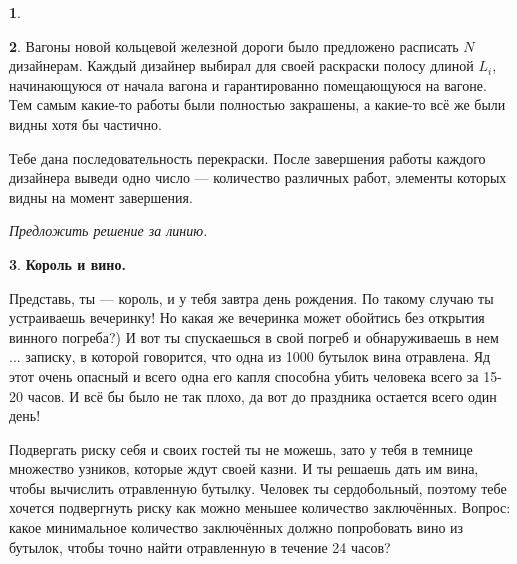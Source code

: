 \documentclass[14pt, a4paper]{extarticle}
\theoremstyle{definition}
\newtheorem{problem}{}
\theoremstyle{definition}
\theoremstyle{remark}
\numberwithin{equation}{section}
\begin{document}
\begin{problem}
\begin{figure}[H]
    \end{figure}
\end{problem}

\begin{problem}
    Вагоны новой кольцевой железной дороги было предложено расписать 
    $N$ дизайнерам. Каждый дизайнер выбирал для своей раскраски полосу 
    длиной $L_i$, начинающуюся от начала вагона и гарантированно 
    помещающуюся на вагоне. Тем самым какие-то работы были полностью 
    закрашены, а какие-то всё же были видны хотя бы частично.

    Тебе дана последовательность перекраски. После завершения работы 
    каждого дизайнера выведи одно число — количество различных работ, 
    элементы которых видны на момент завершения.

    \textit{Предложить решение за линию.}
\end{problem}

\begin{problem}
    \textbf{Король и вино.}

    Представь, ты --- король, и у тебя завтра день рождения. По такому случаю ты устраиваешь
    вечеринку! Но какая же вечеринка может обойтись без открытия винного погреба?)
    И вот ты спускаешься в свой погреб и обнаруживаешь в нем ... записку, в которой говорится,
    что одна из 1000 бутылок вина отравлена. Яд этот очень опасный и всего одна его капля
    способна убить человека всего за 15-20 часов. И всё бы было не так плохо, да вот до праздника
    остается всего один день! 
    
    Подвергать риску себя и своих гостей ты не можешь, зато у тебя 
    в темнице множество узников, которые ждут своей казни. И ты решаешь дать им вина,
    чтобы вычислить отравленную бутылку. Человек ты сердобольный, поэтому тебе хочется подвергнуть
    риску как можно меньшее количество заключённых. Вопрос: какое минимальное количество 
    заключённых должно попробовать вино из бутылок, чтобы точно найти отравленную в течение 24 часов?
\end{problem}
\end{document}
